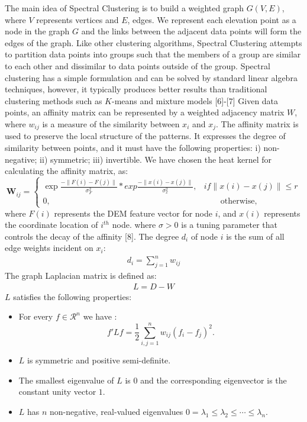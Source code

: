 \documentclass[12pt,letterpaper]{article}
\begin{document}
The main idea of Spectral Clustering is to build a weighted graph $G(V,E)$, where $V$ represents vertices and $E$, edges. 
We represent each elevation point as a node in the graph $G$ and the links between the adjacent data points will form the edges of the graph. Like other clustering algorithms, Spectral Clustering attempts to partition data points into groups such that the 
members of a group are similar to each other and dissimilar to data points outside of the group. Spectral clustering has
a simple formulation and can be solved by standard linear algebra techniques, however, it typically produces better
results than traditional clustering methods such as $K$-means and mixture models [6]-[7]
Given data points, an affinity matrix can be represented by a weighted adjacency matrix $W$, where $w_{ij}$ is a measure
of the similarity between $x_i$ and $x_j$. The affinity matrix is used to preserve the local structure of the patterns. It expresses the degree of similarity between points, and
it must have the following properties: i) non-negative; ii) symmetric; iii) invertible.
We have chosen the heat kernel for calculating the affinity matrix, as:
\begin{equation}
{\mathbf W_{ij}} = \left\{
\begin{array}{rl}
\exp{\frac{- \parallel F(i) - F(j) \parallel}{\sigma_F^2}}*exp{\frac{- \parallel x(i) - x(j) \parallel}{\sigma_x^2}}, & if \parallel x(i) - x(j) \parallel \le r\\
0, & \qquad \text{otherwise},
\end{array} 
\right.
\end{equation} where $F(i)$ represents the DEM feature vector for node $i$, and $x(i)$ represents the coordinate location of $i^{th}$ node.
where $\sigma > 0$ is a tuning parameter that controls the decay of the affinity [8].
The degree $d_i$ of node $i$ is the sum of all edge weights incident on $x_i$:
\begin{align}
d_i = \sum_{j=1}^n w_{ij}
\end{align} 
The graph Laplacian matrix is defined as:
\begin{align}
L = D - W
\end{align}
$L$ satisfies the following properties:
\begin{itemize}
\item For every $f \in \mathcal{R}^n$ we have :
\begin{equation}
f' L f = \frac{1}{2} \sum_{i,j=1}^n w_{ij}(f_i - f_j)^2.
\end{equation}
\item $L$ is symmetric and positive semi-definite.
\item The smallest eigenvalue of $L$ is $0$ and the corresponding eigenvector is the constant unity vector $1$.
\item $L$ has $n$ non-negative, real-valued eigenvalues $0=\lambda_1 \le \lambda_2 \le \cdots \le \lambda_n$.
\end{itemize}
\end{document}
